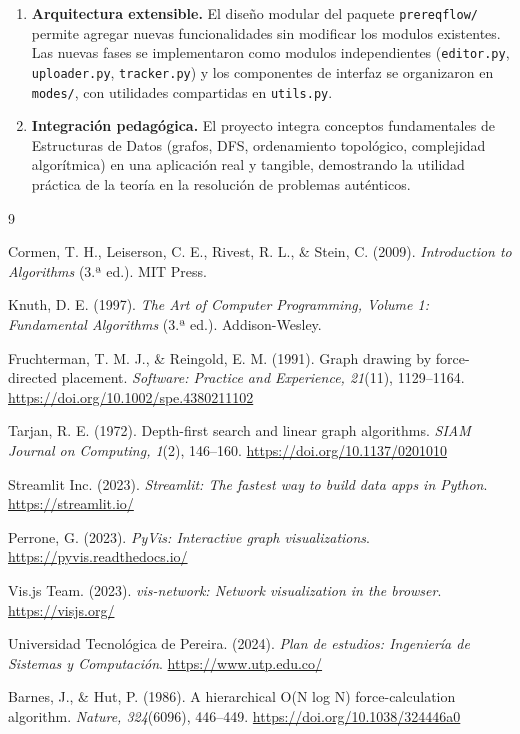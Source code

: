 \documentclass[12pt]{report}
\begin{document}
\begin{enumerate}
    \item \textbf{Arquitectura extensible.} El diseño modular del paquete \texttt{prereqflow/} permite agregar nuevas funcionalidades sin modificar los modulos existentes. Las nuevas fases se implementaron como modulos independientes (\texttt{editor.py}, \texttt{uploader.py}, \texttt{tracker.py}) y los componentes de interfaz se organizaron en \texttt{modes/}, con utilidades compartidas en \texttt{utils.py}.

    \item \textbf{Integración pedagógica.} El proyecto integra conceptos fundamentales de Estructuras de Datos (grafos, DFS, ordenamiento topológico, complejidad algorítmica) en una aplicación real y tangible, demostrando la utilidad práctica de la teoría en la resolución de problemas auténticos.
\end{enumerate}

\begin{thebibliography}{9}

Cormen, T. H., Leiserson, C. E., Rivest, R. L., \& Stein, C. (2009).
\textit{Introduction to Algorithms} (3.ª ed.). MIT Press.

Knuth, D. E. (1997).
\textit{The Art of Computer Programming, Volume 1: Fundamental Algorithms} (3.ª ed.). Addison-Wesley.

Fruchterman, T. M. J., \& Reingold, E. M. (1991).
Graph drawing by force-directed placement.
\textit{Software: Practice and Experience, 21}(11), 1129--1164.
\url{https://doi.org/10.1002/spe.4380211102}

Tarjan, R. E. (1972).
Depth-first search and linear graph algorithms.
\textit{SIAM Journal on Computing, 1}(2), 146--160.
\url{https://doi.org/10.1137/0201010}

Streamlit Inc. (2023).
\textit{Streamlit: The fastest way to build data apps in Python}.
\url{https://streamlit.io/}

Perrone, G. (2023).
\textit{PyVis: Interactive graph visualizations}.
\url{https://pyvis.readthedocs.io/}

Vis.js Team. (2023).
\textit{vis-network: Network visualization in the browser}.
\url{https://visjs.org/}

Universidad Tecnológica de Pereira. (2024).
\textit{Plan de estudios: Ingeniería de Sistemas y Computación}.
\url{https://www.utp.edu.co/}

Barnes, J., \& Hut, P. (1986).
A hierarchical O(N log N) force-calculation algorithm.
\textit{Nature, 324}(6096), 446--449.
\url{https://doi.org/10.1038/324446a0}

\end{thebibliography}
\end{document}
